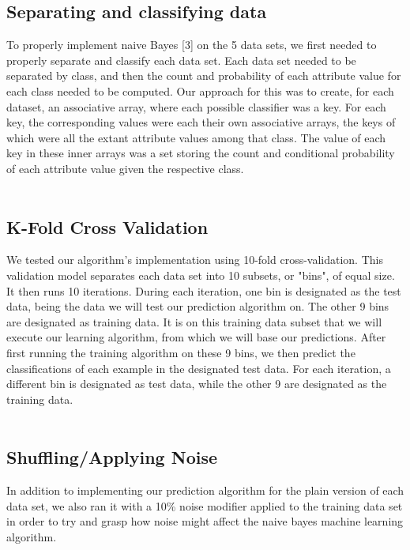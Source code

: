 \documentclass[twoside,11pt]{article}
\begin{document}
\subsection{Separating and classifying data}
To properly implement naive Bayes [3] on the 5 data sets, we first needed to properly separate and classify each data set. Each data set needed to be separated by class, and then the count and probability of each attribute value for each class needed to be computed. Our approach for this was to create, for each dataset, an associative array, where each possible classifier was a key. For each key, the corresponding values were each their own associative arrays, the keys of which were all the extant attribute values among that class. The value of each key in these inner arrays was a set storing the count and conditional probability of each attribute value given the respective class. \\ \\

\subsection{K-Fold Cross Validation}
We tested our algorithm's implementation using 10-fold cross-validation. This validation model separates each data set into 10 subsets, or "bins", of equal size. It then runs 10 iterations. During each iteration, one bin is designated as the test data, being the data we will test our prediction algorithm on. The other 9 bins are designated as training data. It is on this training data subset that we will execute our learning algorithm, from which we will base our predictions. After first running the training algorithm on these 9 bins, we then predict the classifications of each example in the designated test data. For each iteration, a different bin is designated as test data, while the other 9 are designated as the training data. \\ \\

\subsection{Shuffling/Applying Noise}

In addition to implementing our prediction algorithm for the plain version of each data set, we also ran it with a 10\% noise modifier applied to the training data set in order to try and grasp how noise might affect the naive bayes machine learning algorithm. 
\end{document}
